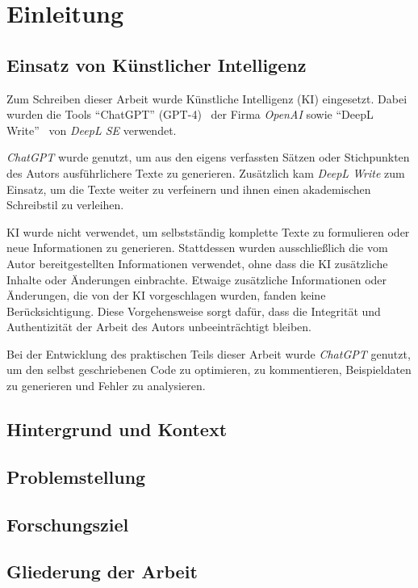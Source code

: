 \chapter{Einleitung}
\section{Einsatz von Künstlicher Intelligenz} %
Zum Schreiben dieser Arbeit wurde Künstliche Intelligenz (KI) eingesetzt.
Dabei wurden die Tools \enquote{ChatGPT} (GPT-4)~\cite{openai_chatgpt_nodate} der Firma \emph{OpenAI} sowie \enquote{DeepL Write}~\cite{deepl_se_deepl_nodate} von \emph{DeepL SE} verwendet.

\emph{ChatGPT} wurde genutzt, um aus den eigens verfassten Sätzen oder Stichpunkten des Autors ausführlichere Texte zu generieren.
Zusätzlich kam \emph{DeepL Write} zum Einsatz, um die Texte weiter zu verfeinern und ihnen einen akademischen Schreibstil zu verleihen.

KI wurde nicht verwendet, um selbstständig komplette Texte zu formulieren oder neue Informationen zu generieren.
Stattdessen wurden ausschließlich die vom Autor bereitgestellten Informationen verwendet, ohne dass die KI zusätzliche Inhalte oder Änderungen einbrachte.
Etwaige zusätzliche Informationen oder Änderungen, die von der KI vorgeschlagen wurden, fanden keine Berücksichtigung.
Diese Vorgehensweise sorgt dafür, dass die Integrität und Authentizität der Arbeit des Autors unbeeinträchtigt bleiben.

Bei der Entwicklung des praktischen Teils dieser Arbeit wurde \emph{ChatGPT} genutzt, um den selbst geschriebenen Code zu optimieren, zu kommentieren, Beispieldaten zu generieren und Fehler zu analysieren.

\section{Hintergrund und Kontext}
\section{Problemstellung}
\section{Forschungsziel}
\section{Gliederung der Arbeit}

